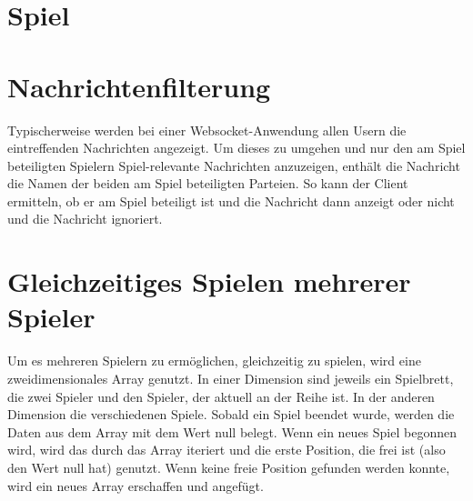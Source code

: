 \section{Spiel}\label{sec:Spiel}

\section{Nachrichtenfilterung}\label{sec:Nachrichtenfilter}
Typischerweise werden bei einer Websocket-Anwendung allen Usern die eintreffenden Nachrichten angezeigt. Um dieses zu umgehen und nur den am Spiel beteiligten Spielern Spiel-relevante Nachrichten anzuzeigen, enthält die Nachricht die Namen der beiden am Spiel beteiligten Parteien. So kann der Client ermitteln, ob er am Spiel beteiligt ist und die Nachricht dann anzeigt oder nicht und die Nachricht ignoriert. 

\section{Gleichzeitiges Spielen mehrerer Spieler}\label{sec:Multiplegames}
Um es mehreren Spielern zu ermöglichen, gleichzeitig zu spielen, wird eine zweidimensionales Array genutzt. In einer Dimension sind jeweils ein Spielbrett, die zwei Spieler und den Spieler, der aktuell an der Reihe ist. In der anderen Dimension die verschiedenen Spiele. Sobald ein Spiel beendet wurde, werden die Daten aus dem Array mit dem Wert null belegt. Wenn ein neues Spiel begonnen wird, wird das durch das Array iteriert und die erste Position, die frei ist (also den Wert null hat) genutzt. Wenn keine freie Position gefunden werden konnte, wird ein neues Array erschaffen und angefügt. 

